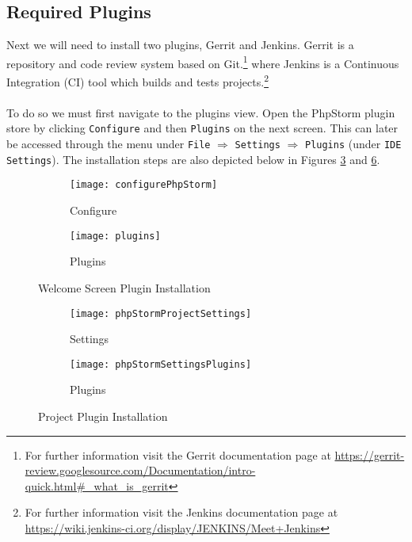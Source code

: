 \newpage

\subsection{Required Plugins}

Next we will need to install two plugins, Gerrit and Jenkins. Gerrit is a repository and code review system based on Git.\footnote{For  further information visit the Gerrit documentation page at \url{https://gerrit-review.googlesource.com/Documentation/intro-quick.html\#\_what\_is\_gerrit}} where Jenkins is a Continuous Integration (CI) tool which builds and tests projects.\footnote{For  further information visit the Jenkins documentation page at \url{https://wiki.jenkins-ci.org/display/JENKINS/Meet+Jenkins}}\\
\\
To do so we must first navigate to the plugins view. Open the PhpStorm plugin store by clicking \texttt{Configure} and then \texttt{Plugins} on the next screen. This can later be accessed through the menu under \texttt{File} $\Rightarrow$ \texttt{Settings} $\Rightarrow$ \texttt{Plugins} (under \texttt{IDE Settings}). The installation steps are also depicted below in Figures \ref{fig:ws-plugin-installation} and \ref{fig:project-plugin-installation}.\\

\begin{figure}[h]
	\centering
	\begin{subfigure}{.5\textwidth}
		\centering
		\texttt{[image: configurePhpStorm]}
		\caption{Configure}
		\label{fig:configurePhpStorm}
	\end{subfigure}%
	\begin{subfigure}{.5\textwidth}
		\centering
		\texttt{[image: plugins]}
		\caption{Plugins}
		\label{fig:plugins}
	\end{subfigure}
	\caption{Welcome Screen Plugin Installation}
	\label{fig:ws-plugin-installation}
\end{figure}

\begin{figure}[h]
	\centering
	\begin{subfigure}{.5\textwidth}
		\centering
		\texttt{[image: phpStormProjectSettings]}
		\caption{Settings}
		\label{fig:phpStormProjectSettings}
	\end{subfigure}%
	\begin{subfigure}{.5\textwidth}
		\centering
		\texttt{[image: phpStormSettingsPlugins]}
		\caption{Plugins}
		\label{fig:plugins}
	\end{subfigure}
	\caption{Project Plugin Installation}
	\label{fig:project-plugin-installation}
\end{figure}

